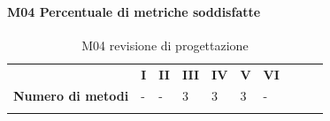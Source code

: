 \paragraph{M04 Percentuale di metriche soddisfatte} \mbox{}
\begin{longtable}[H!] {						
		>{}p{50mm}  		
		>{}p{8mm}
		>{}p{8mm}		
		>{}p{8mm}		
		>{}p{8mm}		
		>{}p{8mm}		
		>{}p{8mm}
		>{}p{8mm}
		>{}p{8mm}
		>{}p{8mm}
	}
	\rowcolor{gray!50}
	\textbf{} & \textbf{I} & \textbf{II} & \textbf{III} & \textbf{IV} & \textbf{V} & \textbf{VI} \TBstrut \\ [2mm]
	\textbf{Numero di metodi} & - & - & 3 & 3 & 3 & - \TBstrut \\ [2mm]
	\rowcolor{white}
	\caption{M04 revisione di progettazione}
\end{longtable}


















